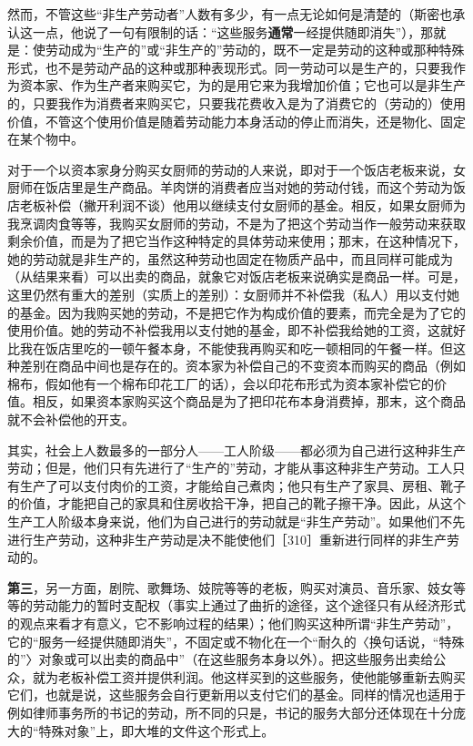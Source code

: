 然而，不管这些“非生产劳动者”人数有多少，有一点无论如何是清楚的（斯密也承认这一点，他说了一句有限制的话：“这些服务\textbf{通常}一经提供随即消失”），那就是：使劳动成为“生产的”或“非生产的”劳动的，既不一定是劳动的这种或那种特殊形式，也不是劳动产品的这种或那种表现形式。同一劳动可以是生产的，只要我作为资本家、作为生产者来购买它，为的是用它来为我增加价值；它也可以是非生产的，只要我作为消费者来购买它，只要我花费收入是为了消费它的（劳动的）使用价值，不管这个使用价值是随着劳动能力本身活动的停止而消失，还是物化、固定在某个物中。

对于一个以资本家身分购买女厨师的劳动的人来说，即对于一个饭店老板来说，女厨师在饭店里是生产商品。羊肉饼的消费者应当对她的劳动付钱，而这个劳动为饭店老板补偿（撇开利润不谈）他用以继续支付女厨师的基金。相反，如果女厨师为我烹调肉食等等，我购买女厨师的劳动，不是为了把这个劳动当作一般劳动来获取剩余价值，而是为了把它当作这种特定的具体劳动来使用；那末，在这种情况下，她的劳动就是非生产的，虽然这种劳动也固定在物质产品中，而且同样可能成为（从结果来看）可以出卖的商品，就象它对饭店老板来说确实是商品一样。可是，这里仍然有重大的差别（实质上的差别）：女厨师并不补偿我（私人）用以支付她的基金。因为我购买她的劳动，不是把它作为构成价值的要素，而完全是为了它的使用价值。她的劳动不补偿我用以支付她的基金，即不补偿我给她的工资，这就好比我在饭店里吃的一顿午餐本身，不能使我再购买和吃一顿相同的午餐一样。但这种差别在商品中间也是存在的。资本家为补偿自己的不变资本而购买的商品（例如棉布，假如他有一个棉布印花工厂的话），会以印花布形式为资本家补偿它的价值。相反，如果资本家购买这个商品是为了把印花布本身消费掉，那末，这个商品就不会补偿他的开支。

其实，社会上人数最多的一部分人——工人阶级——都必须为自己进行这种非生产劳动；但是，他们只有先进行了“生产的”劳动，才能从事这种非生产劳动。工人只有生产了可以支付肉价的工资，才能给自己煮肉；他只有生产了家具、房租、靴子的价值，才能把自己的家具和住房收拾干净，把自己的靴子擦干净。因此，从这个生产工人阶级本身来说，他们为自己进行的劳动就是“非生产劳动”。如果他们不先进行生产劳动，这种非生产劳动是决不能使他们［310］重新进行同样的非生产劳动的。

\textbf{第三}，另一方面，剧院、歌舞场、妓院等等的老板，购买对演员、音乐家、妓女等等的劳动能力的暂时支配权（事实上通过了曲折的途径，这个途径只有从经济形式的观点来看才有意义，它不影响过程的结果）；他们购买这种所谓“非生产劳动”，它的“服务一经提供随即消失”，不固定或不物化在一个“耐久的〈换句话说，“特殊的”〉对象或可以出卖的商品中”（在这些服务本身以外）。把这些服务出卖给公众，就为老板补偿工资并提供利润。他这样买到的这些服务，使他能够重新去购买它们，也就是说，这些服务会自行更新用以支付它们的基金。同样的情况也适用于例如律师事务所的书记的劳动，所不同的只是，书记的服务大部分还体现在十分庞大的“特殊对象”上，即大堆的文件这个形式上。

